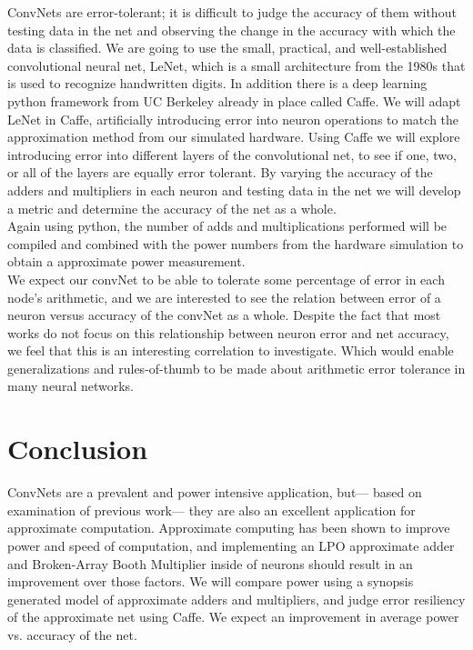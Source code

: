 \documentclass[journal]{IEEEtran}
\begin{document}
	\indent ConvNets are error-tolerant; it is difficult to judge the accuracy of them without testing data in the net and observing the change in  the accuracy with which the data is classified. We are going to use the small, practical, and well-established convolutional neural net, LeNet, which is a small architecture from the 1980s that is used to recognize handwritten digits. In addition there is a deep learning python framework from UC Berkeley already in place called Caffe. We will adapt LeNet in Caffe, artificially introducing error into neuron operations to match the approximation method from our simulated hardware. Using Caffe we will explore introducing error into different layers of the convolutional net, to see if one, two, or all of the layers are equally error tolerant. By varying the accuracy of the adders and multipliers in each neuron and testing data in the net we will develop a metric and determine the accuracy of the net as a whole.\\

	\indent Again using python, the number of adds and multiplications performed will be compiled and combined with the power numbers from the hardware simulation to obtain a approximate power measurement. \\

	\indent We expect our convNet to be able to tolerate some percentage of error in each node's arithmetic, and we are interested to see the relation between error of a neuron versus accuracy of the convNet as a whole. Despite the fact that most works do not focus on this relationship between neuron error and net accuracy, we feel that this is an interesting correlation to investigate. Which would enable generalizations and rules-of-thumb to be made about arithmetic error tolerance in many neural networks.\\

\section{Conclusion}
	\indent ConvNets are a prevalent and power intensive application, but--- based on examination of previous work--- they are also an excellent application for approximate computation. Approximate computing has been shown to improve power and speed of computation, and implementing an LPO approximate adder and Broken-Array Booth Multiplier inside of neurons should result in an improvement over those factors. We will compare power using a synopsis generated model of approximate adders and multipliers, and judge error resiliency of the approximate net using Caffe. We expect an improvement in average power vs. accuracy of the net. 
\end{document}
